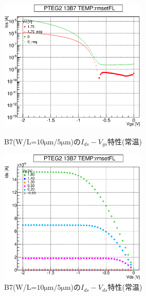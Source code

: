 				\begin{figure}[htbp]
					\begin{minipage}{0.5\hsize}
						\begin{center}
							\includegraphics[width=70mm]{./Chapter/Appendix/Picture/PBT/B7/PTEG2_13_B7_IdVg_rmsetFL.eps}
						\end{center}
						\caption{B7(W/L=$10\mathrm{\mu m}/5\mathrm{\mu m}$)の$I_{ds}-V_{gs}$特性(常温)}
						\label{fig:B7_IdVg_room}
					\end{minipage}
					\begin{minipage}{0.5\hsize}
						\begin{center}
							\includegraphics[width=70mm]{./Chapter/Appendix/Picture/PBT/B7/PTEG2_13_B7_IdVd_rmsetFL.eps}
						\end{center}
						\caption{B7(W/L=$10\mathrm{\mu m}/5\mathrm{\mu m}$)の$I_{ds}-V_{ds}$特性(常温)}
						\label{fig:B7_IdVd_room}
					\end{minipage}
				\end{figure}
